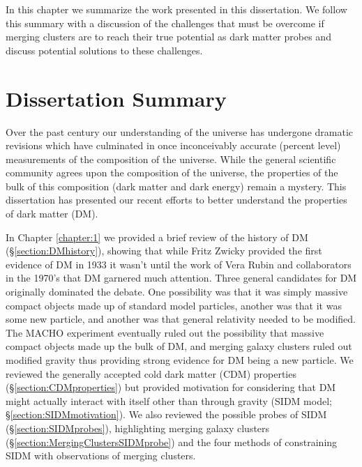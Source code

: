 \label{chapter:5}

In this chapter we summarize the work presented in this dissertation.  We follow this summary with a discussion of the challenges that must be overcome if merging clusters are to reach their true potential as dark matter probes and discuss potential solutions to these challenges.

\section{Dissertation Summary}

Over the past century our understanding of the universe has undergone dramatic revisions which have culminated in once inconceivably accurate (percent level) measurements of the composition of the universe.
While the general scientific community agrees upon the composition of the universe, the properties of the bulk of this composition (dark matter and dark energy) remain a mystery.
This dissertation has presented our recent efforts to better understand the properties of dark matter (DM).

In Chapter \ref{chapter:1} we provided a brief review of the history of DM (\S\ref{section:DMhistory}), showing that while Fritz Zwicky provided the first evidence of DM in 1933 \citep{Zwicky:1933ub} it wasn't until the work of Vera Rubin and collaborators \citep{Rubin:1970gu} in the 1970's that DM garnered much attention.
Three general candidates for DM originally dominated the debate.
One possibility was that it was simply massive compact objects made up of standard model particles, another was that it was some new particle, and another was that general relativity needed to be modified.
The MACHO experiment \citep{Alcock:2000bw} eventually ruled out the possibility that massive compact objects made up the bulk of DM, and merging galaxy clusters ruled out modified gravity \citep{Clowe:2006hr} thus providing strong evidence for DM being a new particle.
We reviewed the generally accepted cold dark matter (CDM) properties (\S\ref{section:CDMproperties}) but provided motivation for considering that DM might actually interact with itself other than through gravity (SIDM model; \S\ref{section:SIDMmotivation}).
We also reviewed the possible probes of SIDM (\S\ref{section:SIDMprobes}), highlighting  merging galaxy clusters (\S\ref{section:MergingClustersSIDMprobe}) and the four methods of constraining SIDM with observations of merging clusters.

